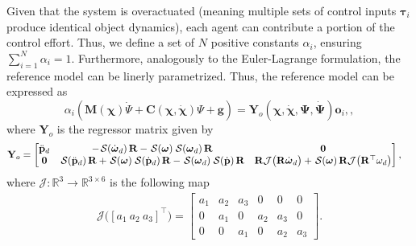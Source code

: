 Given that the system is overactuated (meaning multiple sets of control inputs $\boldsymbol{\tau}_i$ produce identical object dynamics), each agent can contribute a portion of the control effort. Thus, we define a set of $N$ positive constants $\alpha_i$, ensuring $\sum_{i=1}^N\alpha_i=1$. Furthermore, analogously to the Euler-Lagrange formulation, the reference model can be linerly parametrized. Thus, the reference model can be expressed as 
\begin{equation}
    \alpha _i \left(\mathbf {M}(\boldsymbol{\chi})\dot{\Psi} + \mathbf {C}(\boldsymbol{\chi},\dot{\boldsymbol{\chi}})\Psi + \mathbf {g} \right) = \mathbf{Y}_o(\boldsymbol{\chi}, \dot{\boldsymbol{\chi}}, \boldsymbol{\Psi}, \dot{\boldsymbol{\Psi}})\mathbf{o}_i, \label{eq:ref-model-linear-parametrization},
\end{equation}
where $\mathbf{Y}_o$ is the regressor matrix given by
\begin{align}
    \mathbf{Y}_o &= \begin{bmatrix}
        \ddot{\mathbf{p}}_d & -\SL[\dot{\boldsymbol{\omega}}_d]\mathbf{R}-\SL[\boldsymbol{\omega}]\SL[\boldsymbol{\omega}_d]\mathbf{R} & \mathbf{0}\\
        \mathbf{0} & \SL[\ddot{\mathbf{p}}_d]\mathbf{R} + \SL[\boldsymbol{\omega}]\SL[\dot{\mathbf{p}}_d]\mathbf{R} - \SL[\boldsymbol{\omega}_d]\SL[\dot{\mathbf{p}}]\mathbf{R} & \mathbf{R}\mathcal{J}\bigl(\mathbf{R}\dot{\boldsymbol{\omega}}_d\bigr) + \SL[\boldsymbol{\omega}]\mathbf{R}\mathcal{J}\bigl(\mathbf{R}^\top\mathbf{\omega}_d\bigr)
    \end{bmatrix},
\end{align}
where $\mathcal{J}:\mathbb{R}^3\to\mathbb{R}^{3\times6}$ is the following map
\begin{align}
    \mathcal{J}\bigl([a_1\ a_2\ a_3]^\top\bigr)=\begin{bmatrix}
        a_1 & a_2 & a_3 & 0 & 0 & 0 \\
        0 & a_1 & 0 & a_2 & a_3 & 0 \\
        0 & 0 & a_1 & 0 & a_2 & a_3
    \end{bmatrix}.
\end{align}

